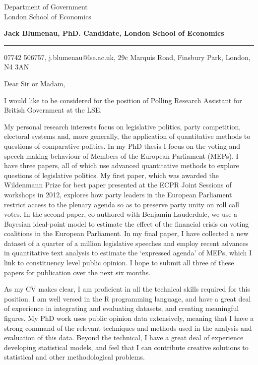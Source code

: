 \documentclass{letter} %
\begin{document}
\signature{Jack Blumenau}           %
\longindentation=0pt                       %
\let\raggedleft\raggedright                %
 
 
\begin{letter}{Department of Government \\
London School of Economics}


\begin{flushleft}
{\large\bf Jack Blumenau, PhD. Candidate, London School of Economics}
\end{flushleft}
\medskip\hrule height 1pt
\begin{flushright}
\hfill 07742 506757, j.blumenau@lse.ac.uk, 29c Marquis Road, Finsbury Park, London, N4 3AN 
\end{flushright} 
\vfill %

 
\opening{Dear Sir or Madam,} 
 
\noindent I would like to be considered for the position of Polling Research Assistant for British Government at the LSE.
 
 \noindent My personal research interests focus on legislative politics, party competition, electoral systems and, more generally, the application of quantitative methods to questions of comparative politics. In my PhD thesis I focus on the voting and speech making behaviour of Members of the European Parliament (MEPs).  I have three papers, all of which use advanced quantitative methods to explore questions of legislative politics. My first paper, which was awarded the Wildenmann Prize for best paper presented at the ECPR Joint Sessions of workshops in 2012, explores how party leaders in the European Parliament restrict access to the plenary agenda so as to preserve party unity on roll call votes. In the second paper, co-authored with Benjamin Lauderdale, we use a Bayesian ideal-point model to estimate the effect of the financial crisis on voting coalitions in the European Parliament. In my final paper, I have collected a new dataset of a quarter of a million legislative speeches and employ recent advances in quantitative text analysis to estimate the `expressed agenda' of MEPs, which I link to constituency level public opinion. I hope to submit all three of these papers for publication over the next six months.
 
\noindent As my CV makes clear, I am proficient in all the technical skills required for this position. I am well versed in the R programming language, and have a great deal of experience in integrating and evaluating datasets, and creating meaningful figures. My PhD work uses public opinion data extensively, meaning that I have a strong command of the relevant techniques and methods used in the analysis and evaluation of this data. Beyond the technical, I have a great deal of experience developing statistical models, and feel that I can contribute creative solutions to statistical and other methodological problems. 


\end{letter}
\end{document}
